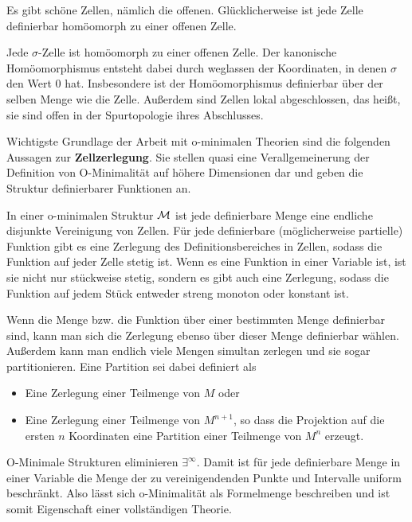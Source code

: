 Es gibt \glqq{}schöne\grqq{} Zellen, nämlich die offenen. Glücklicherweise ist jede Zelle definierbar homöomorph zu einer offenen Zelle.
\begin{lemma}
	Jede $\sigma$-Zelle ist homöomorph zu einer offenen Zelle. Der kanonische Homöomorphismus entsteht dabei durch weglassen der Koordinaten, in denen $\sigma$ den Wert 0 hat. Insbesondere ist der Homöomorphismus definierbar über der selben Menge wie die Zelle. Außerdem sind Zellen lokal abgeschlossen, das heißt, sie sind offen in der Spurtopologie ihres Abschlusses.
\end{lemma}

Wichtigste Grundlage der Arbeit mit o-minimalen Theorien sind die folgenden Aussagen zur \textbf{Zellzerlegung}. Sie stellen quasi eine Verallgemeinerung der Definition von O-Minimalität auf höhere Dimensionen dar und geben die Struktur definierbarer Funktionen an.
\begin{theorem}
	In einer o-minimalen Struktur $\mathcal{M}$ ist jede definierbare Menge eine endliche disjunkte Vereinigung von Zellen. Für jede definierbare (möglicherweise partielle) Funktion gibt es eine Zerlegung des Definitionsbereiches in Zellen, sodass die Funktion auf jeder Zelle stetig ist. Wenn es eine Funktion in einer Variable ist, ist sie nicht nur stückweise stetig, sondern es gibt auch eine Zerlegung, sodass die Funktion auf jedem Stück entweder streng monoton oder konstant ist.
\end{theorem}
\begin{remark}
	Wenn die Menge bzw. die Funktion über einer bestimmten Menge definierbar sind, kann man sich die Zerlegung ebenso über dieser Menge definierbar wählen. Außerdem kann man endlich viele Mengen simultan zerlegen und sie sogar partitionieren. Eine Partition sei dabei definiert als
	\begin{itemize}
		\item Eine Zerlegung einer Teilmenge von $M$ oder
		\item Eine Zerlegung einer Teilmenge von $M^{n+1}$, so dass die Projektion auf die ersten $n$ Koordinaten eine Partition einer Teilmenge von $M^n$ erzeugt.
	\end{itemize}
\end{remark}

\begin{corollary}
	O-Minimale Strukturen eliminieren $\exists^\infty$. Damit ist für jede definierbare Menge in einer Variable die Menge der zu vereinigendenden Punkte und Intervalle uniform beschränkt. Also lässt sich o-Minimalität als Formelmenge beschreiben und ist somit Eigenschaft einer vollständigen Theorie.
\end{corollary}

